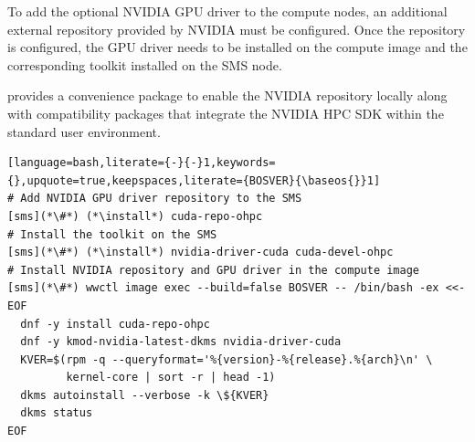 To add the optional NVIDIA GPU driver to the compute nodes, an
additional external \pkgmgr{} repository provided by NVIDIA
must be configured. Once the repository is configured, the
GPU driver needs to be installed on the compute image and the
corresponding toolkit installed on the SMS node.

\OHPC{} provides a convenience package to enable the NVIDIA
repository locally along with compatibility packages that integrate
the NVIDIA HPC SDK within the standard \OHPC{} user environment.

\begin{lstlisting}[language=bash,literate={-}{-}1,keywords={},upquote=true,keepspaces,literate={BOSVER}{\baseos{}}1]
# Add NVIDIA GPU driver repository to the SMS
[sms](*\#*) (*\install*) cuda-repo-ohpc
# Install the toolkit on the SMS
[sms](*\#*) (*\install*) nvidia-driver-cuda cuda-devel-ohpc
# Install NVIDIA repository and GPU driver in the compute image
[sms](*\#*) wwctl image exec --build=false BOSVER -- /bin/bash -ex <<- EOF
  dnf -y install cuda-repo-ohpc
  dnf -y kmod-nvidia-latest-dkms nvidia-driver-cuda
  KVER=$(rpm -q --queryformat='%{version}-%{release}.%{arch}\n' \
         kernel-core | sort -r | head -1)
  dkms autoinstall --verbose -k \${KVER}
  dkms status
EOF

\end{lstlisting}
